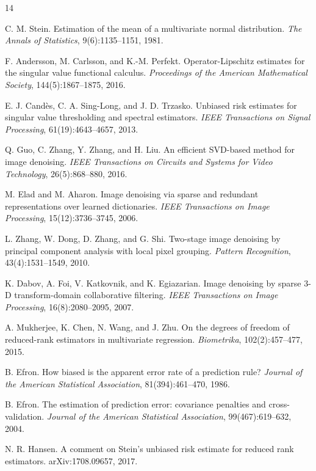 \documentclass[12pt,reqno]{amsart}
\numberwithin{equation}{section}
\theoremstyle{plain}
\theoremstyle{definition}
\begin{document}
\begin{thebibliography}{14}

C. M. Stein.
\newblock Estimation of the mean of a multivariate normal distribution.
\newblock \emph{The Annals of Statistics}, 9(6):1135--1151, 1981.

F. Andersson, M. Carlsson, and K.-M. Perfekt.
\newblock Operator-Lipschitz estimates for the singular value functional calculus.
\newblock \emph{Proceedings of the American Mathematical Society}, 144(5):1867--1875, 2016.

E. J. Cand\`es, C. A. Sing-Long, and J. D. Trzasko.
\newblock Unbiased risk estimates for singular value thresholding and spectral estimators.
\newblock \emph{IEEE Transactions on Signal Processing}, 61(19):4643--4657, 2013.

Q. Guo, C. Zhang, Y. Zhang, and H. Liu.
\newblock An efficient SVD-based method for image denoising.
\newblock \emph{IEEE Transactions on Circuits and Systems for Video Technology}, 26(5):868--880, 2016.

M. Elad and M. Aharon.
\newblock Image denoising via sparse and redundant representations over learned dictionaries.
\newblock \emph{IEEE Transactions on Image Processing}, 15(12):3736--3745, 2006.

L. Zhang, W. Dong, D. Zhang, and G. Shi.
\newblock Two-stage image denoising by principal component analysis with local pixel grouping.
\newblock \emph{Pattern Recognition}, 43(4):1531--1549, 2010.

K. Dabov, A. Foi, V. Katkovnik, and K. Egiazarian.
\newblock Image denoising by sparse 3-D transform-domain collaborative filtering.
\newblock \emph{IEEE Transactions on Image Processing}, 16(8):2080--2095, 2007.

A. Mukherjee, K. Chen, N. Wang, and J. Zhu.
\newblock On the degrees of freedom of reduced-rank estimators in multivariate regression.
\newblock \emph{Biometrika}, 102(2):457--477, 2015.

B. Efron.
\newblock How biased is the apparent error rate of a prediction rule?
\newblock \emph{Journal of the American Statistical Association}, 81(394):461--470, 1986.

B. Efron.
\newblock The estimation of prediction error: covariance penalties and cross-validation.
\newblock \emph{Journal of the American Statistical Association}, 99(467):619--632, 2004.

N. R. Hansen.
\newblock A comment on Stein's unbiased risk estimate for reduced rank estimators.
\newblock arXiv:1708.09657, 2017.

\end{thebibliography}
\end{document}
